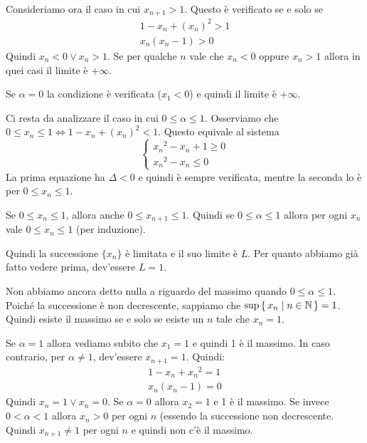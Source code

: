 \begin{example}
Consideriamo ora il caso in cui $x_{n+1} > 1$. Questo è verificato se e solo se
\begin{gather*}
1 - x_n + (x_n)^2 > 1 \\
x_n(x_n-1) > 0
\end{gather*}
Quindi $x_n < 0 \vee x_n > 1$. Se per qualche $n$ vale che $x_n < 0$ oppure $x_n > 1$ allora in quei casi il limite è $+\infty$.

Se $\alpha = 0$ la condizione è verificata ($x_1 < 0$) e quindi il limite  è $+\infty$.

Ci resta da analizzare il caso in cui $0 \le \alpha \le 1$. Osserviamo che $0 \le x_n \le 1 \iff 1 - x_n + (x_n)^2 < 1$. Questo equivale al sistema
\begin{equation*}
\begin{cases}
{x_n}^2 - x_n + 1 \ge 0 \\
{x_n}^2 - x_n \le 0
\end{cases}
\end{equation*}
La prima equazione ha $\Delta < 0$ e quindi è sempre verificata, mentre la seconda lo è per $0 \le x_n \le 1$.

Se $0 \le x_n \le 1$, allora anche $0 \le x_{n+1} \le 1$. Quindi se $0 \le \alpha \le 1$ allora per ogni $x_n$ vale $0 \le x_n \le 1$ (per induzione).

Quindi la successione $\{x_n\}$ è limitata e il suo limite è $L$. Per quanto abbiamo già fatto vedere prima, dev'essere $L = 1$.

Non abbiamo ancora detto nulla a riguardo del massimo quando $0 \le \alpha \le 1$. Poiché la successione è non decrescente, sappiamo che $\sup \set{x_n | n \in \mathbb N} = 1$. Quindi esiste il massimo se e solo se esiste un $n$ tale che $x_n = 1$.

Se $\alpha = 1$ allora vediamo subito che $x_1 = 1$ e quindi 1 è il massimo. In caso contrario, per $\alpha \neq 1$, dev'essere $x_{n+1} = 1$. Quindi:
\begin{gather*}
1 - x_n + {x_n}^2 = 1 \\
x_n(x_n-1) = 0
\end{gather*}
Quindi $x_n = 1 \vee x_n = 0$. Se $\alpha = 0$ allora $x_2 = 1$ e 1 è il massimo. Se invece $0 < \alpha < 1$ allora $x_n > 0$ per ogni $n$ (essendo la successione non decrescente. Quindi $x_{n+1} \neq 1$ per ogni $n$ e quindi non c'è il massimo.
\end{example}

